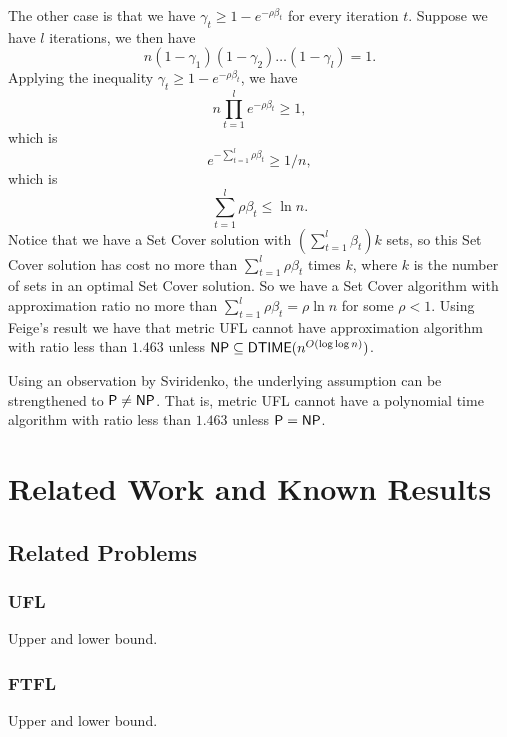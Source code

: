 \documentclass[oneside,final]{ucr}
\begin{document}
The other case is that we have $\gamma_t \geq 1-e^{-\rho\beta_t}$
for every iteration $t$. Suppose we have $l$ iterations, we
then have
\begin{equation*}
  n (1-\gamma_1) (1-\gamma_2) \ldots (1-\gamma_l) = 1.
\end{equation*}
Applying the inequality $\gamma_t \geq 1 - e^{-\rho\beta_t}$, we
have
\begin{equation*}
  n \prod_{t=1}^l e^{-\rho\beta_t} \geq 1,
\end{equation*}
which is
\begin{equation*}
  e^{-\sum_{t=1}^l \rho\beta_t} \geq 1/n,
\end{equation*}
which is
\begin{equation*}
  \sum_{t=1}^l \rho\beta_t \leq \ln n.
\end{equation*}
Notice that we have a Set Cover solution with $(\sum_{t=1}^l
\beta_t)k$ sets, so this Set Cover solution has cost no more
than $\sum_{t=1}^l \rho\beta_t$ times $k$, where $k$ is the
number of sets in an optimal Set Cover solution. So we have
a Set Cover algorithm with approximation ratio no more than
$\sum_{t=1}^l \rho\beta_t = \rho \ln n$ for some $\rho <
1$. Using Feige's result we have that metric UFL cannot have
approximation algorithm with ratio less than $1.463$ unless
${\mbox{\sf NP}} \subseteq {\mbox{\sf DTIME}}(n^{O(\log\log n)})$.

Using an observation by Sviridenko, the underlying
assumption can be strengthened to ${\mbox{\sf P}} \neq {\mbox{\sf NP}}$. That is,
metric UFL cannot have a polynomial time algorithm with
ratio less than $1.463$ unless ${\mbox{\sf P}} = {\mbox{\sf NP}}$.

\chapter{Related Work and Known Results} \label{ch: related_work}

\section{Related Problems}

\subsection{UFL}
Upper and lower bound.

\subsection{FTFL}
Upper and lower bound.
\end{document}

